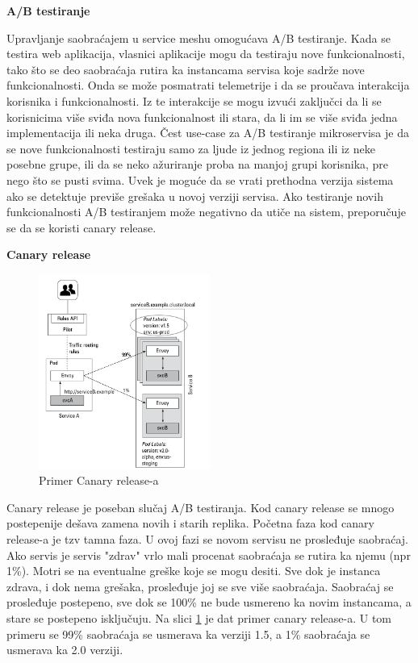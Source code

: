 \documentclass[a4paper,12pt]{report}
\begin{document}
\textbf{A/B testiranje}\newline

Upravljanje saobraćajem u service meshu omogućava A/B testiranje. Kada se testira web aplikacija, vlasnici aplikacije mogu da testiraju nove funkcionalnosti, tako što se deo saobraćaja rutira ka instancama servisa koje sadrže nove funkcionalnosti. Onda se može posmatrati telemetrije i da se proučava interakcija korisnika i funkcionalnosti. Iz te interakcije se mogu izvući zaključci da li se korisnicima više sviđa nova funkcionalnost ili stara, da li im se više sviđa jedna implementacija ili neka druga. Čest use-case za A/B testiranje mikroservisa je da se nove funkcionalnosti testiraju samo za ljude iz jednog regiona ili iz neke posebne grupe, ili da se neko ažuriranje proba na manjoj grupi korisnika, pre nego što se pusti svima. Uvek je moguće da se vrati prethodna verzija sistema ako se detektuje previše grešaka u novoj verziji servisa. Ako testiranje novih funkcionalnosti A/B testiranjem može negativno da utiče na sistem, preporučuje se da se koristi canary release.\newline

\textbf{Canary release}\newline

\begin{figure}[h]
    \centering
    \includegraphics[width=0.5\textwidth]{canary_release_example}
    \caption{Primer Canary release-a}
    \label{fig:canary-release-example}
\end{figure}

Canary release je poseban slučaj A/B testiranja. Kod canary release se mnogo postepenije dešava zamena novih i starih replika. Početna faza kod canary release-a je tzv tamna faza. U ovoj fazi se novom servisu ne prosleđuje saobraćaj. Ako servis je servis "zdrav" vrlo mali procenat saobraćaja se rutira ka njemu (npr 1\%). Motri se na eventualne greške koje se mogu desiti. Sve dok je instanca zdrava, i dok nema grešaka, prosleđuje joj se sve više saobraćaja. Saobraćaj se prosleđuje postepeno, sve dok se 100\% ne bude usmereno ka novim instancama, a stare se postepeno isključuju. Na slici \ref{fig:canary-release-example} je dat primer canary release-a. U tom primeru se 99\% saobraćaja se usmerava ka verziji 1.5, a 1\% saobraćaja se usmerava ka 2.0 verziji. \newline
\end{document}
